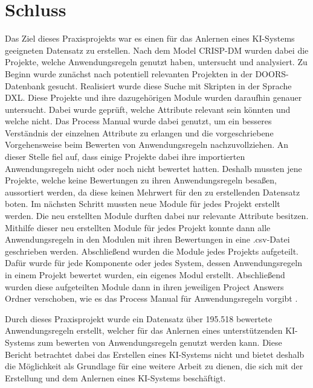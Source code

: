 \chapter{Schluss}
\label{chap:Schluss}
Das Ziel dieses Praxisprojekts war es einen für das Anlernen eines KI-Systems geeigneten Datensatz zu erstellen. Nach dem Model \acs{CRISP-DM} wurden dabei die Projekte, welche
Anwendungsregeln genutzt haben, untersucht und analysiert. Zu Beginn wurde zunächst nach potentiell relevanten Projekten in der \acs{DOORS}-Datenbank gesucht. Realisiert wurde diese Suche mit Skripten
in der Sprache \acs{DXL}.
Diese Projekte und ihre dazugehörigen Module wurden daraufhin genauer untersucht. Dabei wurde geprüft, welche Attribute relevant sein könnten und welche nicht. Das Process Manual wurde dabei genutzt,
um ein besseres Verständnis der einzelnen Attribute zu erlangen und die vorgeschriebene Vorgehensweise beim Bewerten von Anwendungsregeln nachzuvollziehen. An dieser Stelle fiel auf, dass einige
Projekte dabei ihre importierten Anwendungsregeln nicht oder noch nicht bewertet hatten. Deshalb mussten jene Projekte, welche keine Bewertungen zu ihren Anwendungsregeln besaßen, aussortiert werden,
da diese keinen Mehrwert für den zu erstellenden Datensatz boten. Im nächsten Schritt mussten neue Module für jedes Projekt erstellt werden. Die neu erstellten Module durften dabei nur relevante Attribute
besitzen. Mithilfe dieser neu erstellten Module für jedes Projekt konnte dann alle Anwendungsregeln in den Modulen mit ihren Bewertungen in eine .csv-Datei geschrieben werden. Abschließend wurden die Module
jedes Projekts aufgeteilt. Dafür wurde für jede Komponente oder jedes System, dessen Anwendungsregeln in einem Projekt bewertet wurden, ein eigenes Modul erstellt. Abschließend wurden diese aufgeteilten 
Module dann in ihren jeweiligen Project Answers Ordner verschoben, wie es das Process Manual für Anwendungsregeln vorgibt \cite[S.32]{q2}. 

Durch dieses Praxisprojekt wurde ein Datensatz über 195.518 bewertete Anwendungsregeln erstellt, welcher für das Anlernen eines unterstützenden KI-Systems zum bewerten von Anwendungsregeln genutzt werden
kann. Diese Bericht betrachtet dabei das Erstellen eines KI-Systems nicht und bietet deshalb die Möglichkeit als Grundlage für eine weitere Arbeit zu dienen, die sich mit der Erstellung und dem Anlernen
eines KI-Systems beschäftigt.
